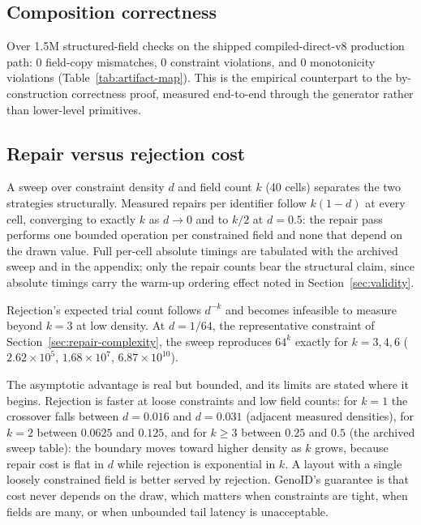 \documentclass{svproc}
\begin{document}
\subsection{Composition correctness}
\label{sec:composition-correctness}
Over 1.5M structured-field checks on the shipped compiled-direct-v8 production path: 0 field-copy mismatches, 0 constraint violations, and 0 monotonicity violations (Table~\ref{tab:artifact-map}). This is the empirical counterpart to the by-construction correctness proof, measured end-to-end through the generator rather than lower-level primitives.

\subsection{Repair versus rejection cost}
\label{sec:repair-vs-rejection}

A sweep over constraint density $d$ and field count $k$ (40 cells)
separates the two strategies structurally. Measured repairs per
identifier follow $k(1-d)$ at every cell, converging to exactly $k$ as
$d \to 0$ and to $k/2$ at $d=0.5$: the repair pass performs
one bounded operation per constrained field and none that depend on the
drawn value. Full per-cell absolute timings are tabulated with the archived sweep and in the appendix; only the repair counts bear the structural claim, since absolute timings
carry the warm-up ordering effect noted in Section~\ref{sec:validity}.

Rejection's expected trial count follows $d^{-k}$ and becomes infeasible to measure beyond $k=3$ at low density. At $d=1/64$, the representative constraint of Section~\ref{sec:repair-complexity}, the sweep reproduces $64^k$ exactly for $k=3,4,6$ ($2.62\times10^{5}$, $1.68\times10^{7}$, $6.87\times10^{10}$).

The asymptotic advantage is real but bounded, and its limits are stated where it
begins. Rejection is faster at loose constraints and low field counts:
for $k=1$ the crossover falls between $d=0.016$ and $d=0.031$ (adjacent
measured densities), for $k=2$ between $0.0625$ and $0.125$, and for
$k \geq 3$ between $0.25$ and $0.5$ (the archived sweep table):
the boundary moves toward higher density as $k$ grows, because repair cost
is flat in $d$ while rejection is exponential in $k$. A layout with a single loosely constrained field is
better served by rejection. GenoID's guarantee is that cost never depends
on the draw, which matters when constraints are tight, when fields are
many, or when unbounded tail latency is unacceptable.
\end{document}
